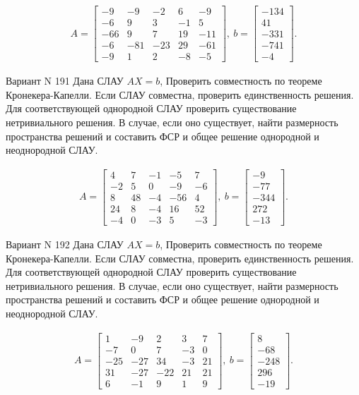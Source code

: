 \documentclass[11pt]{report}
\begin{document}
\begin{align*}
 A = \left[\begin{matrix}-9 & -9 & -2 & 6 & -9\\-6 & 9 & 3 & -1 & 5\\-66 & 9 & 7 & 19 & -11\\-6 & -81 & -23 & 29 & -61\\-9 & 1 & 2 & -8 & -5\end{matrix}\right],
\ b = \left[\begin{matrix}-134\\41\\-331\\-741\\-4\end{matrix}\right]. 
 \end{align*}

Вариант N 191
Дана СЛАУ $AX = b$,
Проверить совместность по теореме Кронекера-Капелли. Если СЛАУ совместна, проверить единственность решения.
Для соответствующей однородной СЛАУ проверить существование нетривиального решения. В случае, если оно существует,
найти размерность пространства решений и составить ФСР и общее решение однородной  и неоднородной СЛАУ.


\begin{align*}
 A = \left[\begin{matrix}4 & 7 & -1 & -5 & 7\\-2 & 5 & 0 & -9 & -6\\8 & 48 & -4 & -56 & 4\\24 & 8 & -4 & 16 & 52\\-4 & 0 & -3 & 5 & -3\end{matrix}\right],
\ b = \left[\begin{matrix}-9\\-77\\-344\\272\\-13\end{matrix}\right]. 
 \end{align*}

Вариант N 192
Дана СЛАУ $AX = b$,
Проверить совместность по теореме Кронекера-Капелли. Если СЛАУ совместна, проверить единственность решения.
Для соответствующей однородной СЛАУ проверить существование нетривиального решения. В случае, если оно существует,
найти размерность пространства решений и составить ФСР и общее решение однородной  и неоднородной СЛАУ.


\begin{align*}
 A = \left[\begin{matrix}1 & -9 & 2 & 3 & 7\\-7 & 0 & 7 & -3 & 0\\-25 & -27 & 34 & -3 & 21\\31 & -27 & -22 & 21 & 21\\6 & -1 & 9 & 1 & 9\end{matrix}\right],
\ b = \left[\begin{matrix}8\\-68\\-248\\296\\-19\end{matrix}\right]. 
 \end{align*}
\end{document}
